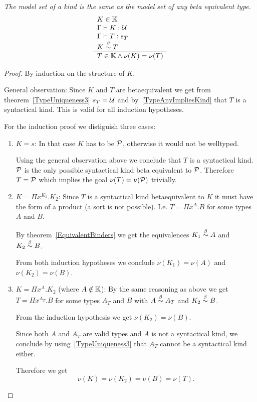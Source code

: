 \begin{lemma}
    \label{ModelEquivalentKinds}
    \emph{The model set of a kind is the same as the model set of any beta
    equivalent type}.
    $$
    \begin{array}{l} 
        K \in \mathbb{K}
        \\
        \Gamma \vdash K: {\cal U}
        \\
        \Gamma \vdash T: s_T
        \\
        K \stackrel{\beta}{\sim} T
     \\ \hline 
        T \in \mathbb{K} \land \nu(K) = \nu(T)
    \end{array}
    $$

    \begin{proof}
        By induction on the structure of $K$.

        General observation: Since $K$ and $T$ are betaequivalent we get from
        theorem~\ref{TypeUniqueness3} $s_T = {\cal U}$ and
        by~\ref{TypeAnyImpliesKind} that $T$ is a syntactical kind. This is
        valid for all induction hypotheses.

        For the induction proof we distiguish three cases:
        \begin{enumerate}
        \item $K = s$: In that case $K$ has to be ${\cal P}$, otherwise it would
            not be welltyped.

            Using the general observation above we conclude that
            $T$ is a syntactical kind. ${\cal P}$ is the only possible syntactical
                kind beta equivalent to ${\cal P}$. Therefore $T = {\cal P}$ which
                implies the goal $\nu(T) = \nu({\cal P})$ trivially.

        \item $K = \Pi x^{K_1}. K_2$:
            Since $T$ is a syntactical kind betaequivalent to $K$ it must have
                the form of a product (a sort is not possible). I.e. $T = \Pi
                x^A.B$ for some types $A$ and $B$.

            By theorem~\ref{EquivalentBinders} we get the equivalences $K_1
                \stackrel{\beta}{\sim} A$ and $K_2 \stackrel{\beta}{\sim} B$.

            From both induction hypotheses we conclude $\nu(K_1) = \nu(A)$ and
            $\nu(K_2) = \nu(B)$.


        \item $K = \Pi x^A . K_2$ (where $A \notin \mathbb{K}$):
            By the same reasoning as above we get $T = \Pi x^{A_T}.B$ for some
            types $A_T$ and $B$ with $A \stackrel{\beta}{\sim} A_T$ and $ K_2 \stackrel{\beta}{\sim} B$.

                From the induction hypothesis we get $\nu(K_2) = \nu(B)$.

            Since both $A$ and $A_T$ are valid types and $A$ is not a
                syntactical kind, we conclude by using~\ref{TypeUniqueness3}
                that $A_T$ cannot be a syntactical kind either.

            Therefore we get
            $$
                \nu(K) = \nu(K_2) = \nu(B) = \nu(T).
            $$
        \end{enumerate}
    \end{proof}
\end{lemma}


